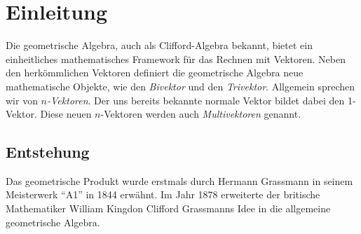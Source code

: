%
%
%
%
\section{Einleitung\label{geoalgebra:section:einfuehrung}}
Die geometrische Algebra, auch als Clifford-Algebra bekannt, bietet ein einheitliches mathematisches
%
%
Framework für das Rechnen mit Vektoren.
Neben den herkömmlichen Vektoren definiert die geometrische
Algebra neue mathematische Objekte, wie den \emph{Bivektor} und den \emph{Trivektor}. Allgemein sprechen wir von
%
\emph{$n$-Vektoren}.
Der uns bereits bekannte normale Vektor bildet dabei den 1-Vektor. Diese neuen $n$-Vektoren werden auch
\emph{Multivektoren} genannt.
%

\subsection{Entstehung}
Das geometrische Produkt wurde erstmals durch Hermann Grassmann in seinem Meisterwerk ``A1'' \cite{geoalgebra:grassmann1844lineale} in 1844
%
erwähnt. Im Jahr 1878 erweiterte der britische Mathematiker William Kingdon Clifford Grassmanns Idee
%
in die allgemeine geometrische Algebra. 

